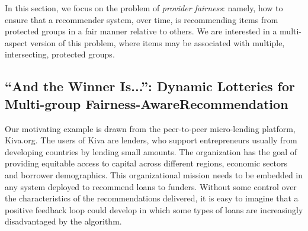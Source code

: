 

In this section, we focus on the problem of \textit{provider fairness}: namely, how to ensure that a recommender system, over time, is recommending items from protected groups in a fair manner relative to others. We are interested in a multi-aspect version of this problem, where items may be associated with multiple, intersecting, protected groups.

\subsection{“And the Winner Is...”: Dynamic Lotteries for Multi-group Fairness-AwareRecommendation}

Our motivating example is drawn from the peer-to-peer micro-lending platform, Kiva.org. The users of Kiva are lenders, who support entrepreneurs usually from developing countries by lending small amounts. The organization has the goal of providing equitable access to capital across different regions, economic sectors and borrower demographics. This organizational mission needs to be embedded in any system deployed to recommend loans to funders. Without some control over the characteristics of the recommendations delivered, it is easy to imagine that a positive feedback loop \cite{sun2019debiasing} could develop in which some types of loans are increasingly disadvantaged by the algorithm.

